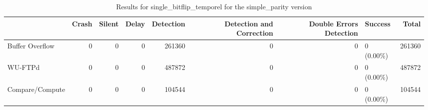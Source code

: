 \begin{table}[t]
	\centering
	\caption{Results for single_bitflip_temporel for the simple_parity version}
	\label{table:end_sim_by_status_simple_parity_1_single_bitflip_temporel}
	\begin{tabular}{lrrrrrrlr}
		\toprule
		                & Crash & Silent & Delay & Detection & Detection and Correction & Double Errors Detection & Success    & Total  \\
		\midrule
		Buffer Overflow & 0     & 0      & 0     & 261360    & 0                        & 0                       & 0 (0.00\%) & 261360 \\
		WU-FTPd         & 0     & 0      & 0     & 487872    & 0                        & 0                       & 0 (0.00\%) & 487872 \\
		Compare/Compute & 0     & 0      & 0     & 104544    & 0                        & 0                       & 0 (0.00\%) & 104544 \\
		\bottomrule
	\end{tabular}
\end{table}

